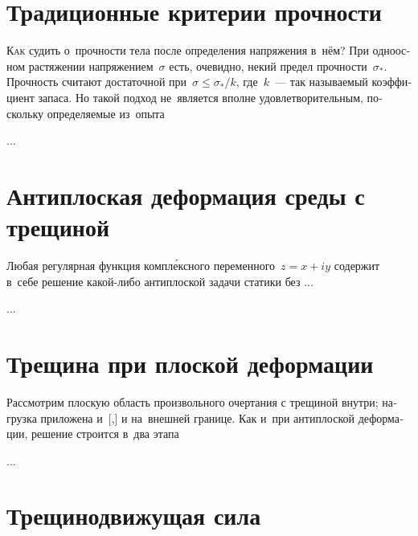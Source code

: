 

\thispagestyle{empty}

\label{chapter:fractures}

\begin{otherlanguage}{russian}

\section{Традиционные критерии прочности}

\lettrine[lines=2, findent=2pt, nindent=0pt]{К}{ак} судить о~прочности тела после определения напряжения в~нём? При одноосном растяжении напряжением~$\sigma$ есть, очевидно, некий предел прочности~${\sigma_{\!*}}$. Прочность считают достаточной при~${\sigma \leq \sigma_{\!*} / k}$, где~$k$~--- так называемый коэффициент запаса. Но такой подход не~является вполне удовлетворительным, поскольку определяемые из~опыта

...

\section{Антиплоская деформация среды с трещиной}

Любая регулярная функция компл\'{е}ксного переменного~${z = x + iy}$ содержит в~себе решение какой\hbox{-}либо антиплоской задачи статики без ...

...



\section{Трещина при плоской деформации}

Рассмотрим плоскую область произвольного очертания с трещиной внутри; нагрузка приложена и~[,] и на~внешней границе. Как и~при антиплоской деформации, решение строится в~два этапа

...



\section{Трещинодвижущая сила}


\end{otherlanguage}
